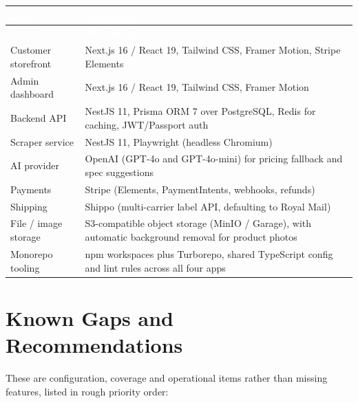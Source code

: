 \documentclass[11pt,a4paper]{article}
\begin{document}
\begin{longtable}{>{\raggedright\arraybackslash}p{4.3cm}
                   >{\raggedright\arraybackslash}p{10.3cm}}
\toprule
\rowcolor{Accent}
\textcolor{white}{\textbf{Layer}} & \textcolor{white}{\textbf{Technology}} \\
\midrule
\endfirsthead
\toprule
\rowcolor{Accent}
\textcolor{white}{\textbf{Layer}} & \textcolor{white}{\textbf{Technology}} \\
\midrule
\endhead
\bottomrule
\endlastfoot

Customer storefront & Next.js 16 / React 19, Tailwind CSS, Framer Motion, Stripe Elements \\[3pt]
Admin dashboard & Next.js 16 / React 19, Tailwind CSS, Framer Motion \\[3pt]
Backend API & NestJS 11, Prisma ORM 7 over PostgreSQL, Redis for caching, JWT/Passport auth \\[3pt]
Scraper service & NestJS 11, Playwright (headless Chromium) \\[3pt]
AI provider & OpenAI (GPT-4o and GPT-4o-mini) for pricing fallback and spec suggestions \\[3pt]
Payments & Stripe (Elements, PaymentIntents, webhooks, refunds) \\[3pt]
Shipping & Shippo (multi-carrier label API, defaulting to Royal Mail) \\[3pt]
File / image storage & S3-compatible object storage (MinIO / Garage), with automatic background removal for product photos \\[3pt]
Monorepo tooling & npm workspaces plus Turborepo, shared TypeScript config and lint rules across all four apps \\

\end{longtable}

\section{Known Gaps and Recommendations}
\label{sec:gaps}

These are configuration, coverage and operational items rather than missing features, listed in rough priority order:
\end{document}
